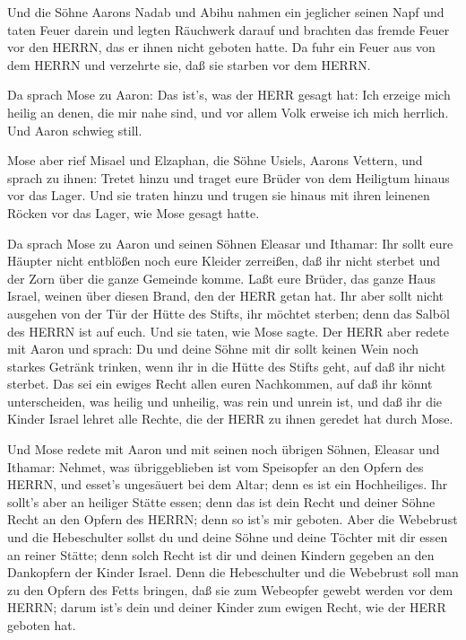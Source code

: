  Und die Söhne Aarons Nadab und Abihu nahmen ein jeglicher
seinen Napf und taten Feuer darein und legten Räuchwerk darauf und
brachten das fremde Feuer vor den HERRN, das er ihnen nicht geboten
hatte.  Da fuhr ein Feuer aus von dem HERRN und verzehrte
sie, daß sie starben vor dem HERRN.

 Da sprach Mose zu Aaron: Das ist's, was der HERR gesagt
hat: Ich erzeige mich heilig an denen, die mir nahe sind, und vor allem
Volk erweise ich mich herrlich. Und Aaron schwieg still.

 Mose aber rief Misael und Elzaphan, die Söhne Usiels,
Aarons Vettern, und sprach zu ihnen: Tretet hinzu und traget eure Brüder
von dem Heiligtum hinaus vor das Lager.  Und sie traten
hinzu und trugen sie hinaus mit ihren leinenen Röcken vor das Lager, wie
Mose gesagt hatte.

 Da sprach Mose zu Aaron und seinen Söhnen Eleasar und
Ithamar: Ihr sollt eure Häupter nicht entblößen noch eure Kleider
zerreißen, daß ihr nicht sterbet und der Zorn über die ganze Gemeinde
komme. Laßt eure Brüder, das ganze Haus Israel, weinen über diesen
Brand, den der HERR getan hat.  Ihr aber sollt nicht
ausgehen von der Tür der Hütte des Stifts, ihr möchtet sterben; denn das
Salböl des HERRN ist auf euch. Und sie taten, wie Mose sagte.
 Der HERR aber redete mit Aaron und sprach:  Du
und deine Söhne mit dir sollt keinen Wein noch starkes Getränk trinken,
wenn ihr in die Hütte des Stifts geht, auf daß ihr nicht sterbet. Das
sei ein ewiges Recht allen euren Nachkommen,  auf daß ihr
könnt unterscheiden, was heilig und unheilig, was rein und unrein ist,
 und daß ihr die Kinder Israel lehret alle Rechte, die der
HERR zu ihnen geredet hat durch Mose.

 Und Mose redete mit Aaron und mit seinen noch übrigen
Söhnen, Eleasar und Ithamar: Nehmet, was übriggeblieben ist vom
Speisopfer an den Opfern des HERRN, und esset's ungesäuert bei dem
Altar; denn es ist ein Hochheiliges.  Ihr sollt's aber an
heiliger Stätte essen; denn das ist dein Recht und deiner Söhne Recht an
den Opfern des HERRN; denn so ist's mir geboten.  Aber die
Webebrust und die Hebeschulter sollst du und deine Söhne und deine
Töchter mit dir essen an reiner Stätte; denn solch Recht ist dir und
deinen Kindern gegeben an den Dankopfern der Kinder Israel.
 Denn die Hebeschulter und die Webebrust soll man zu den
Opfern des Fetts bringen, daß sie zum Webeopfer gewebt werden vor dem
HERRN; darum ist's dein und deiner Kinder zum ewigen Recht, wie der HERR
geboten hat.

